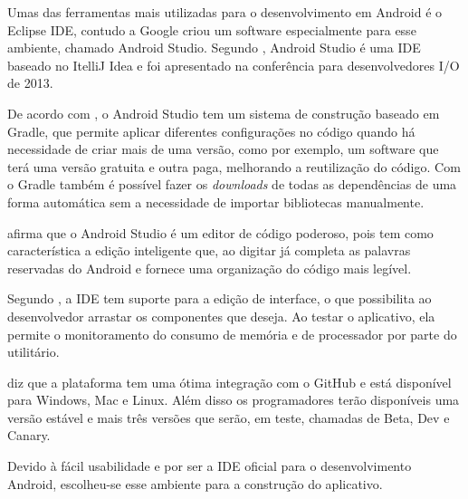 
	\par Umas das ferramentas mais utilizadas para o desenvolvimento em Android é
o Eclipse IDE, contudo a Google criou um software especialmente para esse
ambiente, chamado Android Studio. Segundo , Android
Studio é uma IDE baseado no ItelliJ Idea e foi apresentado na conferência para
desenvolvedores I/O de {2013}.

	\par De acordo com , o Android Studio tem um
sistema de construção baseado em Gradle, que permite aplicar
diferentes configurações no código quando há necessidade de criar mais de uma
versão, como por exemplo, um software que terá uma versão gratuita e
outra paga, melhorando a reutilização do código. Com o Gradle também é
possível fazer os \textit{downloads} de todas as dependências de uma forma
automática sem a necessidade de importar bibliotecas manualmente.

	\par {} afirma que o Android Studio é um editor
de código poderoso, pois tem como característica a edição inteligente que, ao
digitar já completa as palavras reservadas do Android e fornece uma
organização do código mais legível.

	\par Segundo , a IDE tem suporte para a edição de
interface, o que possibilita ao desenvolvedor arrastar os componentes que
deseja. Ao testar o aplicativo, ela permite o monitoramento do consumo de
memória e de processador por parte do utilitário.

	\par {} diz que a plataforma tem uma ótima integração com
o GitHub e está disponível para Windows, Mac e
Linux. Além disso os programadores terão disponíveis uma versão
estável e mais três versões que serão, em teste, chamadas de Beta,
Dev e Canary.

	\par Devido à fácil usabilidade e por ser a IDE oficial para o desenvolvimento
Android, escolheu-se esse ambiente para a construção do aplicativo.